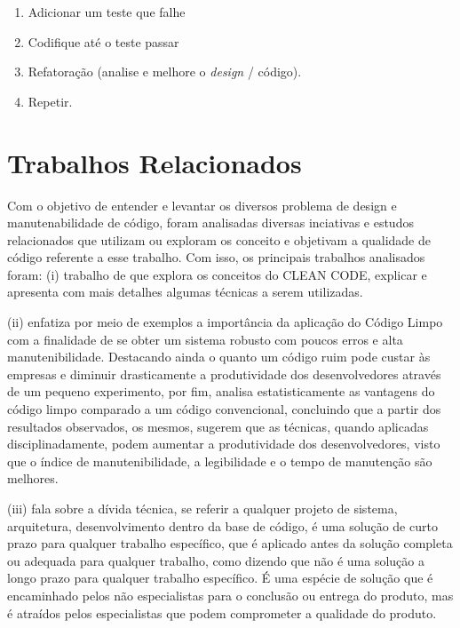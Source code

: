 \documentclass[12pt]{article}
\begin{document}
\begin{enumerate}
 \item Adicionar um teste que falhe
 \item Codifique até o teste passar
 \item Refatoração (analise e melhore o \textit{design} / código).
 \item Repetir.
\end{enumerate}

	

\part{Trabalhos Relacionados} \label{sec:trabalhosrelacionados}

Com o objetivo de entender e levantar os diversos problema de design e manutenabilidade de código, foram analisadas diversas inciativas e estudos relacionados que utilizam ou exploram os conceito e objetivam a qualidade de código referente a esse trabalho.
Com isso, os principais trabalhos analisados foram: (i) trabalho de \cite{TR_CLEAN_CODE_INTRODUCAO} que explora os conceitos do CLEAN CODE, explicar e apresenta com mais detalhes algumas técnicas a serem utilizadas.

 (ii) \cite{TR_CLEAN_CODE_IMPORTANCIA} enfatiza por meio de exemplos a importância da aplicação do
Código Limpo com a finalidade de se obter um sistema robusto com poucos erros e alta manutenibilidade. Destacando ainda o quanto um código ruim pode custar às empresas e diminuir drasticamente a produtividade dos desenvolvedores através de um pequeno experimento, por fim, analisa estatisticamente as vantagens do código limpo comparado a um código convencional, concluindo que a partir dos resultados observados, os mesmos, sugerem que as técnicas, quando aplicadas disciplinadamente, podem aumentar a produtividade dos desenvolvedores, visto que o índice de manutenibilidade, a legibilidade e o tempo de manutenção são melhores.
 
 (iii) \cite{TR_QC_TECHNICAL_DEBT} fala sobre a dívida técnica, se referir a qualquer projeto de sistema, arquitetura, desenvolvimento dentro da base de código, é uma solução de curto prazo para qualquer trabalho específico, que é aplicado antes da solução completa ou adequada para
qualquer trabalho, como dizendo que não é uma solução a longo prazo para qualquer trabalho específico. É uma espécie de solução que é encaminhado pelos não especialistas para o conclusão ou entrega do produto, mas é atraídos pelos especialistas que podem comprometer a qualidade do produto.
\end{document}
